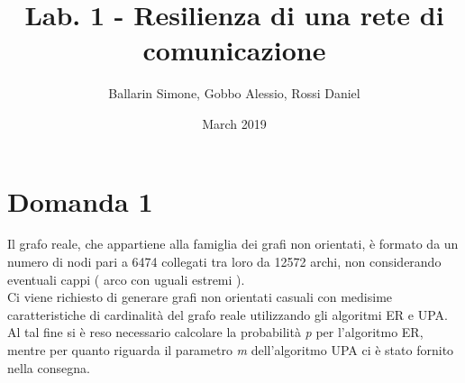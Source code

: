 \documentclass{article}
\title{Lab. 1 - Resilienza di una rete di comunicazione}
\author{Ballarin Simone, Gobbo Alessio, Rossi Daniel}
\date{March 2019}
\begin{document}
\maketitle

\section*{Domanda 1}
Il grafo reale, che appartiene alla famiglia dei grafi non orientati, è formato da un numero di nodi pari a 6474 collegati tra loro da 12572 archi, non considerando eventuali cappi ( arco con uguali estremi ).\\
Ci viene richiesto di generare grafi non orientati casuali con medisime caratteristiche di cardinalità del grafo reale utilizzando gli algoritmi ER e UPA.\\
Al tal fine si è reso necessario calcolare la probabilità \textit{p} per l'algoritmo ER, mentre per quanto riguarda il parametro \textit{m} dell'algoritmo UPA ci è stato fornito nella consegna.
\end{document}
